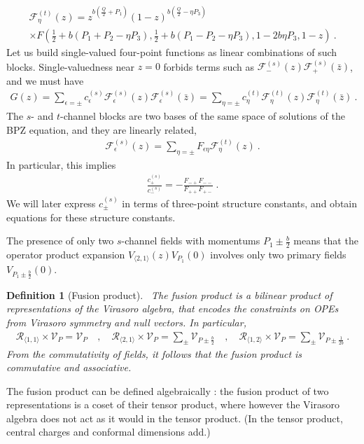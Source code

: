 \documentclass[12pt, a4paper]{article}
\theoremstyle{break}
\newtheorem{defn}[exo]{Definition}
\begin{document}
\begin{multline}
 \mathcal{F}^{(t)}_\eta(z) = z^{b(\frac{Q}{2}+P_1)} (1-z)^{b(\frac{Q}{2}-\eta P_3)}
 \\
 \times F\left(\tfrac12 + b(P_1+P_2-\eta P_3), \tfrac12 + b(P_1-P_2-\eta P_3), 1 - 2b\eta P_3, 1-z\right)\ .
 \label{tpm}
\end{multline}
Let us build single-valued four-point functions as linear combinations of such blocks. Single-valuedness near $z=0$ forbids terms such as $\mathcal{F}^{(s)}_{-}(z) \mathcal{F}^{(s)}_{+}(\bar z)$, and we must have 
\begin{align}
 G(z) = \sum_{\epsilon=\pm} c^{(s)}_{\epsilon} \mathcal{F}^{(s)}_{\epsilon}(z) \mathcal{F}^{(s)}_{\epsilon}(\bar z) = \sum_{\eta=\pm} c^{(t)}_{\eta} \mathcal{F}^{(t)}_{\eta}(z) \mathcal{F}^{(t)}_{\eta}(\bar z)\ .
 \label{gz}
\end{align}
The $s$- and $t$-channel blocks are two bases of the same space of solutions of the BPZ equation, and they are linearly related,
\begin{align}
 \mathcal{F}^{(s)}_{\epsilon}(z) = \sum_{\eta=\pm} F_{\epsilon\eta} \mathcal{F}^{(t)}_{\eta}(z)\ .
\end{align}
In particular, this implies 
\begin{align}
 \frac{c_{+}^{(s)}}{c_{-}^{(s)}} = -\frac{F_{-+}F_{--}}{F_{++}F_{+-}} \ .
 \label{eq:coc}
\end{align}
We will later express $c_\pm^{(s)}$ in terms of three-point structure constants, and obtain equations for these structure constants.

The presence of only two $s$-channel fields with momentums $P_1\pm \frac{b}{2}$ means that the operator product expansion $V_{\langle 2, 1 \rangle}(z) V_{P_1}(0)$ involves only two primary fields $V_{P_1\pm \frac{b}{2}}(0)$. 

\begin{defn}[Fusion product]
 ~\label{def:fus}
 The fusion product is a bilinear product of representations of the Virasoro algebra, that encodes the constraints on OPEs from Virasoro symmetry and null vectors. In particular,
 \begin{align}
  \mathcal{R}_{\langle 1,1\rangle}\times \mathcal V_P = \mathcal V_P \quad , \quad 
  \mathcal{R}_{\langle 2,1\rangle}\times \mathcal V_P = \sum_\pm \mathcal V_{P\pm \frac{b}{2}}\quad , \quad  
  \mathcal{R}_{\langle 1,2\rangle}\times \mathcal V_P = \sum_\pm \mathcal V_{P\pm \frac{1}{2b}}\ .
  \label{eq:rv}
 \end{align}
 From the commutativity of fields, it follows that the fusion product is commutative and associative.
\end{defn}
The fusion product can be defined algebraically \cite{gab99}: the fusion product of two representations is a coset of their tensor product, where however the Virasoro algebra does not act as it would in the tensor product. (In the tensor product, central charges and conformal dimensions add.) 
\end{document}
